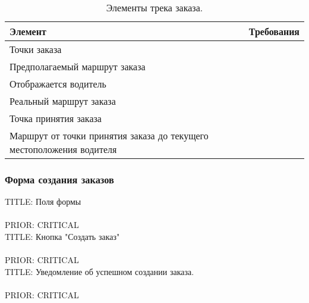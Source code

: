 				\begin{table}[h]
	                \begin{center}
	                \caption {Элементы трека заказа.}
	                \label{order_track_elements}
	                \setlength{\extrarowheight}{2mm}
	                \begin{tabular}{|p{5cm}|p{10cm}|}
	                   \hline     \textbf{Элемент}&\textbf{Требования} \\ [2mm]

	                   \hline  Точки заказа   & \\ [2mm]
	                   \hline  Предполагаемый маршрут заказа   & \\ [2mm]
	                   \hline  Отображается водитель   & \\ [2mm]
	                   \hline  Реальный маршрут заказа  & \\ [2mm]
	                   \hline  Точка принятия заказа   & \\ [2mm]
	                   \hline  Маршрут от точки принятия заказа до текущего местоположения водителя   & \\ [2mm]

	                   \hline
	                \end{tabular}
	                \end{center}
                \end{table}


		\subsubsection{Форма создания заказов}


				TITLE: Поля формы\\
				\\
				PRIOR: CRITICAL\\

				TITLE: Кнопка "Создать заказ"\\
				\\
				PRIOR: CRITICAL\\

				TITLE: Уведомление об успешном создании заказа.\\
				\\
				PRIOR: CRITICAL\\

